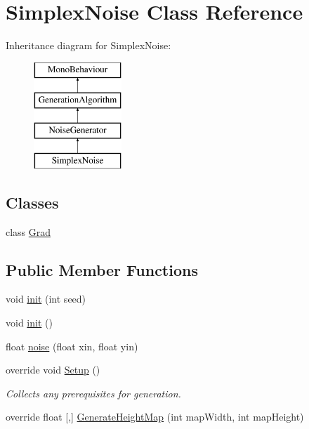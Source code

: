 \hypertarget{class_simplex_noise}{}\section{Simplex\+Noise Class Reference}
\label{class_simplex_noise}
Inheritance diagram for Simplex\+Noise\+:\begin{figure}[H]
\begin{center}
\leavevmode
\includegraphics[height=4.000000cm]{class_simplex_noise}
\end{center}
\end{figure}
\subsection*{Classes}
\begin{DoxyCompactItemize}
\item 
class \mbox{\hyperlink{class_simplex_noise_1_1_grad}{Grad}}
\end{DoxyCompactItemize}
\subsection*{Public Member Functions}
\begin{DoxyCompactItemize}
\item 
void \mbox{\hyperlink{class_simplex_noise_a616d1987674e90392904a65c7618c9d4}{init}} (int seed)
\item 
void \mbox{\hyperlink{class_simplex_noise_a151aceb21de5c48ab4b5ff7bf82f6b61}{init}} ()
\item 
float \mbox{\hyperlink{class_simplex_noise_a86ab5f95259f74f43d00a00b695d5755}{noise}} (float xin, float yin)
\item 
override void \mbox{\hyperlink{class_simplex_noise_a43164ec5960921789ce75e83651717cf}{Setup}} ()
\begin{DoxyCompactList}\small\item\em Collects any prerequisites for generation. \end{DoxyCompactList}\item 
override float \mbox{[},\mbox{]} \mbox{\hyperlink{class_simplex_noise_aea5b04e1455da3c6eb8b29deb28a239c}{Generate\+Height\+Map}} (int map\+Width, int map\+Height)
\end{DoxyCompactItemize}
